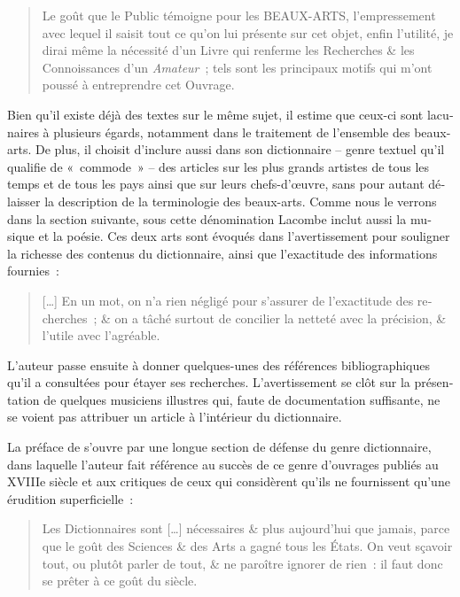 \documentclass[output=paper,colorlinks,citecolor=brown,arabicfont,chinesefont,booklanguage=french]{langscibook}
\begin{document}
\begin{otherlanguage}{french}
\begin{quote}
    Le goût que le Public témoigne pour les BEAUX-ARTS, l’empressement avec lequel il saisit tout ce qu’on lui présente sur cet objet, enfin l’utilité, je dirai même la nécessité d’un Livre qui renferme les Recherches \& les Connoissances d’un \emph{Amateur}~; tels sont les principaux motifs qui m’ont poussé à entreprendre cet Ouvrage. 
\end{quote}

Bien qu’il existe déjà des textes sur le même sujet, il estime que ceux-ci sont lacunaires à plusieurs égards, notamment dans le traitement de l’ensemble des beaux-arts. De plus, il choisit d’inclure aussi dans son dictionnaire – genre textuel qu’il qualifie de «~commode~» – des articles sur les plus grands artistes de tous les temps et de tous les pays ainsi que sur leurs chefs-d’œuvre, sans pour autant délaisser la description de la terminologie des beaux-arts. Comme nous le verrons dans la section suivante, sous cette dénomination Lacombe inclut aussi la musique et la poésie. Ces deux arts sont évoqués dans l’avertissement pour souligner la richesse des contenus du dictionnaire, ainsi que l’exactitude des informations fournies~: 

\begin{quote}
    […] En un mot, on n’a rien négligé pour s’assurer de l’exactitude des recherches~; \& on a tâché surtout de concilier la netteté avec la précision, \& l’utile avec l’agréable.  
\end{quote}

L’auteur passe ensuite à donner quelques-unes des références bibliographiques qu’il a consultées pour étayer ses recherches. L’avertissement se clôt sur la présentation de quelques musiciens illustres qui, faute de documentation suffisante, ne se voient pas attribuer un article à l’intérieur du dictionnaire. 

La préface de \citealt{Pernety1757} s’ouvre par une longue section de défense du genre dictionnaire, dans laquelle l’auteur fait référence au succès de ce genre d’ouvrages publiés au XVIIIe siècle et aux critiques de ceux qui considèrent qu’ils ne fournissent qu’une érudition superficielle~:

\begin{quote}
    Les Dictionnaires sont […] nécessaires \& plus aujourd’hui que jamais, parce que le goût des Sciences \& des Arts a gagné tous les États. On veut sçavoir tout, ou plutôt parler de tout, \& ne paroître ignorer de rien~: il faut donc se prêter à ce goût du siècle.
\end{quote}


\end{otherlanguage}
\end{document}
